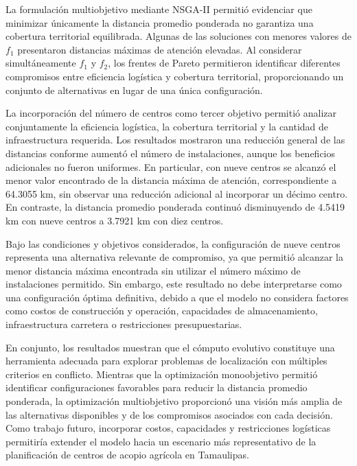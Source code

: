 \documentclass[journal]{IEEEtran}
\begin{document}
La formulación multiobjetivo mediante NSGA-II permitió evidenciar que minimizar únicamente la distancia promedio ponderada no garantiza una cobertura territorial equilibrada. Algunas de las soluciones con menores valores de $f_1$ presentaron distancias máximas de atención elevadas. Al considerar simultáneamente $f_1$ y $f_2$, los frentes de Pareto permitieron identificar diferentes compromisos entre eficiencia logística y cobertura territorial, proporcionando un conjunto de alternativas en lugar de una única configuración.

La incorporación del número de centros como tercer objetivo permitió analizar conjuntamente la eficiencia logística, la cobertura territorial y la cantidad de infraestructura requerida. Los resultados mostraron una reducción general de las distancias conforme aumentó el número de instalaciones, aunque los beneficios adicionales no fueron uniformes. En particular, con nueve centros se alcanzó el menor valor encontrado de la distancia máxima de atención, correspondiente a 64.3055 km, sin observar una reducción adicional al incorporar un décimo centro. En contraste, la distancia promedio ponderada continuó disminuyendo de 4.5419 km con nueve centros a 3.7921 km con diez centros.

Bajo las condiciones y objetivos considerados, la configuración de nueve centros representa una alternativa relevante de compromiso, ya que permitió alcanzar la menor distancia máxima encontrada sin utilizar el número máximo de instalaciones permitido. Sin embargo, este resultado no debe interpretarse como una configuración óptima definitiva, debido a que el modelo no considera factores como costos de construcción y operación, capacidades de almacenamiento, infraestructura carretera o restricciones presupuestarias.

En conjunto, los resultados muestran que el cómputo evolutivo constituye una herramienta adecuada para explorar problemas de localización con múltiples criterios en conflicto. Mientras que la optimización monoobjetivo permitió identificar configuraciones favorables para reducir la distancia promedio ponderada, la optimización multiobjetivo proporcionó una visión más amplia de las alternativas disponibles y de los compromisos asociados con cada decisión. Como trabajo futuro, incorporar costos, capacidades y restricciones logísticas permitiría extender el modelo hacia un escenario más representativo de la planificación de centros de acopio agrícola en Tamaulipas.
\end{document}
